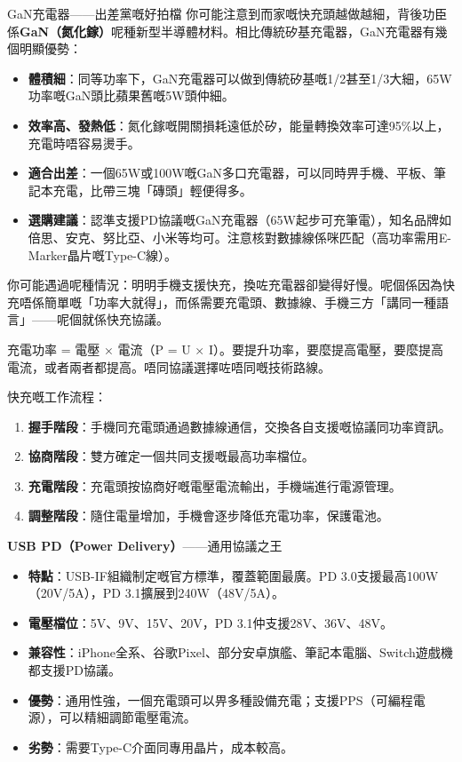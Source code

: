 \begin{tcbinfo}{GaN充電器——出差黨嘅好拍檔}
你可能注意到而家嘅快充頭越做越細，背後功臣係\textbf{GaN（氮化鎵）}呢種新型半導體材料。相比傳統矽基充電器，GaN充電器有幾個明顯優勢：

\begin{itemize}
  \item \textbf{體積細}：同等功率下，GaN充電器可以做到傳統矽基嘅1/2甚至1/3大細，65W功率嘅GaN頭比蘋果舊嘅5W頭仲細。
  \item \textbf{效率高、發熱低}：氮化鎵嘅開關損耗遠低於矽，能量轉換效率可達95\%以上，充電時唔容易燙手。
  \item \textbf{適合出差}：一個65W或100W嘅GaN多口充電器，可以同時畀手機、平板、筆記本充電，比帶三塊「磚頭」輕便得多。
  \item \textbf{選購建議}：認準支援PD協議嘅GaN充電器（65W起步可充筆電），知名品牌如倍思、安克、努比亞、小米等均可。注意核對數據線係咪匹配（高功率需用E-Marker晶片嘅Type-C線）。
\end{itemize}

\end{tcbinfo}


你可能遇過呢種情況：明明手機支援快充，換咗充電器卻變得好慢。呢個係因為快充唔係簡單嘅「功率大就得」，而係需要充電頭、數據線、手機三方「講同一種語言」——呢個就係快充協議。


充電功率 = 電壓 × 電流（P = U × I）。要提升功率，要麼提高電壓，要麼提高電流，或者兩者都提高。唔同協議選擇咗唔同嘅技術路線。

快充嘅工作流程：

\begin{enumerate}
  \item \textbf{握手階段}：手機同充電頭通過數據線通信，交換各自支援嘅協議同功率資訊。
  \item \textbf{協商階段}：雙方確定一個共同支援嘅最高功率檔位。
  \item \textbf{充電階段}：充電頭按協商好嘅電壓電流輸出，手機端進行電源管理。
  \item \textbf{調整階段}：隨住電量增加，手機會逐步降低充電功率，保護電池。
\end{enumerate}


\textbf{USB PD（Power Delivery）}——通用協議之王

\begin{itemize}
  \item \textbf{特點}：USB-IF組織制定嘅官方標準，覆蓋範圍最廣。PD 3.0支援最高100W（20V/5A），PD 3.1擴展到240W（48V/5A）。
  \item \textbf{電壓檔位}：5V、9V、15V、20V，PD 3.1仲支援28V、36V、48V。
  \item \textbf{兼容性}：iPhone全系、谷歌Pixel、部分安卓旗艦、筆記本電腦、Switch遊戲機都支援PD協議。
  \item \textbf{優勢}：通用性強，一個充電頭可以畀多種設備充電；支援PPS（可編程電源），可以精細調節電壓電流。
  \item \textbf{劣勢}：需要Type-C介面同專用晶片，成本較高。
\end{itemize}

